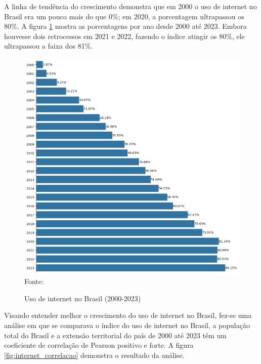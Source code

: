 A linha de tendência do crescimento demonstra que em 2000 o uso de internet no Brasil era um pouco mais do que 0\%; em 2020, a porcentagem ultrapassou os 80\%. A figura \ref{fig:uso_internet_brasil_itu} mostra as porcentagens por ano desde 2000 até 2023. Embora houvesse dois retrocessos em 2021 e 2022, fazendo o índice atingir os 80\%, ele ultrapassou a faixa dos 81\%.

\begin{figure}[ht]
    \centering
    \caption{Uso de internet no Brasil (2000-2023)}
    \includegraphics[width=1\linewidth]{figuras/internet/barplot_uso_internet_brasil_itu.png}
    \label{fig:uso_internet_brasil_itu}
    \footnotesize{Fonte: \cite{ITU_uso_internet_brasil}}
\end{figure}

Visando entender melhor o crescimento do uso de internet no Brasil, fez-se uma análise em que se comparava o índice do uso de internet no Brasil, a população total do Brasil e a extensão territorial do país de 2000 até 2023 têm um coeficiente de correlação de Pearson positivo e forte. A figura \ref{fig:internet_correlacao} demonstra o resultado da análise.

